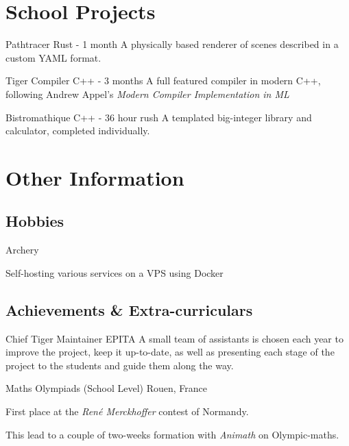 

\section{School Projects}

\begin{twenty}

    {Pathtracer}
    {Rust - 1 month}
    {A physically based renderer of scenes described in a custom YAML format.}

    {Tiger Compiler}
    {C++ - 3 months}
    {A full featured compiler in modern C++, following Andrew Appel's
    \textit{Modern Compiler Implementation in ML}}

    {Bistromathique}
    {C++ - 36 hour rush}
    {A templated big-integer library and calculator, completed individually.}

\end{twenty}



\section{Other Information}

\subsection{Hobbies}

\begin{twenty}

  \twentyitemshort{}
    {Archery}

  \twentyitemshort{}
    {Self-hosting various services on a VPS using Docker}

\end{twenty}

\subsection{Achievements \& Extra-curriculars}

\begin{twenty}

    {Chief Tiger Maintainer}
    {EPITA}
    {A small team of assistants is chosen each year to improve the project, keep
    it up-to-date, as well as presenting each stage of the project to the
    students and guide them along the way.}

    {Maths Olympiads (School Level)}
    {Rouen, France}
    {First place at the \textit{René Merckhoffer} contest of Normandy.

    This lead to a couple of two-weeks formation with \textit{Animath} on
    Olympic-maths.}

\end{twenty}

